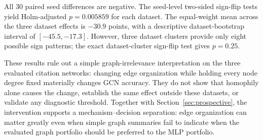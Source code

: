 All 30 paired seed differences are negative. The seed-level two-sided sign-flip tests yield Holm-adjusted $p=0.005859$ for each dataset. The equal-weight mean across the three dataset effects is $-30.9$ points, with a descriptive dataset-bootstrap interval of $[-45.5,-17.3]$. However, three dataset clusters provide only eight possible sign patterns; the exact dataset-cluster sign-flip test gives $p=0.25$.

These results rule out a simple graph-irrelevance interpretation on the three evaluated citation networks: changing edge organization while holding every node degree fixed materially changes GCN accuracy. They do not show that homophily alone causes the change, establish the same effect outside these datasets, or validate any diagnostic threshold. Together with Section~\ref{sec:prospective}, the intervention supports a mechanism--decision separation: edge organization can matter greatly even when simple graph summaries fail to indicate when the evaluated graph portfolio should be preferred to the MLP portfolio.
